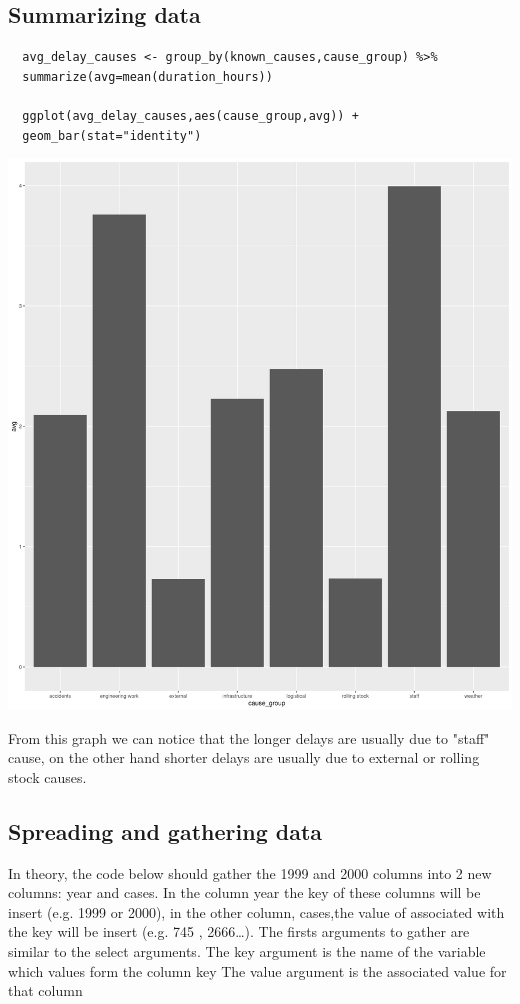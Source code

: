 \documentclass[11pt]{article}
\begin{document}
\subsection{Summarizing data}
\label{sec:org03e671d}
\begin{verbatim}
  avg_delay_causes <- group_by(known_causes,cause_group) %>%
  summarize(avg=mean(duration_hours))

  ggplot(avg_delay_causes,aes(cause_group,avg)) +
  geom_bar(stat="identity")
\end{verbatim}

\begin{center}
  \includegraphics[width=.9\linewidth]{avg_delay_causes.jpg}
\end{center}

From this graph we can notice that the longer delays are usually due to "staff" cause, on the other hand
shorter delays are usually due to external or rolling stock causes.

\subsection{Spreading and gathering data}
\label{sec:org3105884}

In theory, the code below should gather the 1999 and 2000 columns into 2 new columns:
year and cases. In the column year the key of these columns will be insert (e.g. 1999 or 2000),
in the other column, cases,the value of associated with the key will be insert (e.g. 745 , 2666\ldots{}).
The firsts arguments to gather are similar to the select arguments.
The key argument is the name of the variable which values form the column key
The value argument is the associated value for that column
\end{document}
